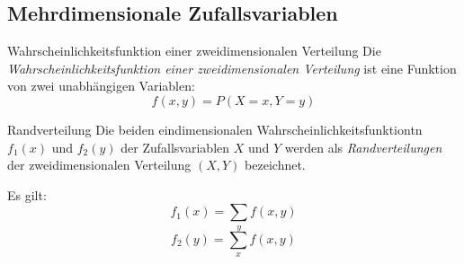\subsection{Mehrdimensionale Zufallsvariablen}

\begin{defi}{Wahrscheinlichkeitsfunktion einer zweidimensionalen Verteilung}
    Die \emph{Wahrscheinlichkeitsfunktion einer zweidimensionalen Verteilung} ist eine Funktion von zwei unabhängigen Variablen:
    \[
        f(x,y) = P(X = x, Y = y)
    \]
\end{defi}

\begin{defi}{Randverteilung}
    Die beiden eindimensionalen Wahrscheinlichkeitsfunktiontn $f_1(x)$ und $f_2(y)$ der Zufallsvariablen $X$ und $Y$ werden als \emph{Randverteilungen} der zweidimensionalen Verteilung $(X,Y)$ bezeichnet.

    Es gilt:
    \[
        f_1(x) = \sum_{y} f(x,y)
    \]
    \[
        f_2(y) = \sum_{x} f(x,y)
    \]
\end{defi}

